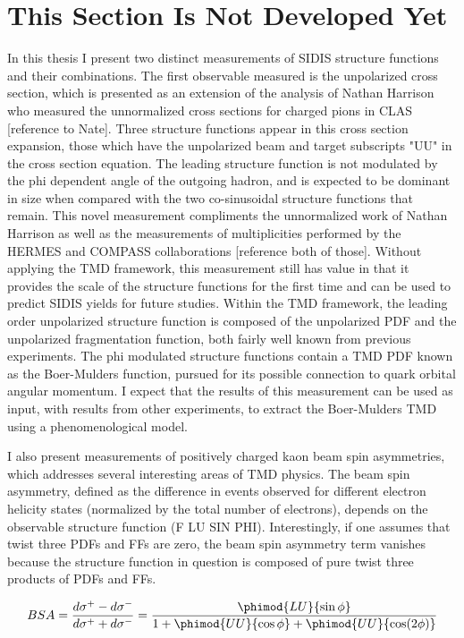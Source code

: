 \section{This Section Is Not Developed Yet}
In this thesis I present two distinct measurements of SIDIS structure functions and their combinations.  The first observable measured is the unpolarized cross section, which is presented as an extension of the analysis of Nathan Harrison who measured the unnormalized cross sections for charged pions in CLAS [reference to Nate].  Three structure functions appear in this cross section expansion, those which have the unpolarized beam and target subscripts "UU" in the cross section equation.  The leading structure function is not modulated by the phi dependent angle of the outgoing hadron, and is expected to be dominant in size when compared with the two co-sinusoidal structure functions that remain.  This novel measurement compliments the unnormalized work of Nathan Harrison as well as the measurements of multiplicities performed by the HERMES and COMPASS collaborations [reference both of those].  Without applying the TMD framework, this measurement still has value in that it provides the scale of the structure functions for the first time and can be used to predict SIDIS yields for future studies.  Within the TMD framework, the leading order unpolarized structure function is composed of the unpolarized PDF and the unpolarized fragmentation function, both fairly well known from previous experiments.  The phi modulated structure functions contain a TMD PDF known as the Boer-Mulders function, pursued for its possible connection to quark orbital angular momentum.  I expect that the results of this measurement can be used as input, with results from other experiments, to extract the Boer-Mulders TMD using a phenomenological model.

I also present measurements of positively charged kaon beam spin asymmetries, which addresses several interesting areas of TMD physics.  The beam spin asymmetry, defined as the difference in events observed for different electron helicity states (normalized by the total number of electrons), depends on the observable structure function (F LU SIN PHI).  Interestingly, if one assumes that twist three PDFs and FFs are zero, the beam spin asymmetry term vanishes because the structure function in question is composed of pure twist three products of PDFs and FFs.

\begin{equation}
  BSA = \frac{d\sigma^+ - d\sigma^-}{d\sigma^+ + d\sigma^-} = \frac{\phimod{LU}{\sin\phi}}{1 + \phimod{UU}{\cos\phi} + \phimod{UU}{\cos(2\phi)}}
\end{equation}

